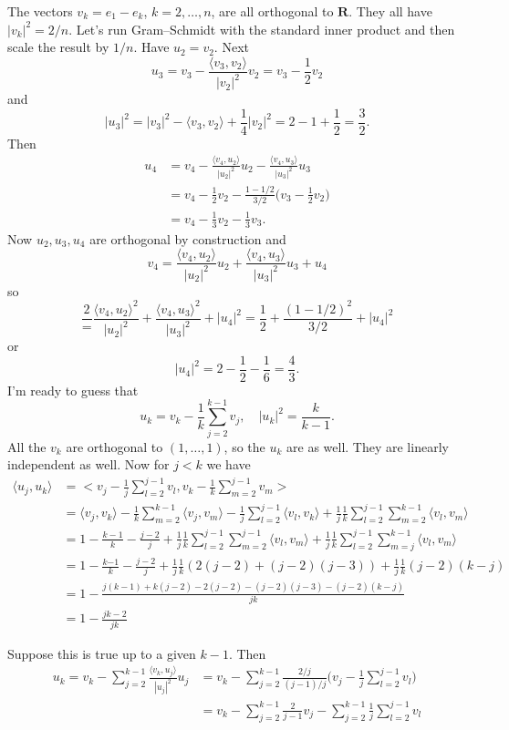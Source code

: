 \documentclass[11pt]{amsart}
\theoremstyle{definition}
\def\RR{\mathbf{R}}
\def\<{\langle}
\def\>{\rangle}
\begin{document}
The vectors $v_k = e_1 - e_k$, $k = 2, \ldots, n$, are all orthogonal to $\RR$.
They all have $|v_k|^2 = 2 / n$.
Let's run Gram--Schmidt with the standard inner product and then scale the result by $1/n$.
Have $u_2 = v_2$.
Next 
\[
u_3 
= v_3
- \frac{\<v_3, v_2\>}{|v_2|^2} v_2
= v_3
- \frac{1}{2} v_2
\]
and
\[
|u_3|^2
= |v_3|^2 - \< v_3, v_2 \> + \frac14 |v_2|^2
= 2 - 1 + \frac12
= \frac 32.
\]
Then
\begin{align*}
u_4
&= v_4
- \frac{\<v_4, u_2\>}{|u_2|^2} u_2
- \frac{\<v_4, u_3\>}{|u_3|^2} u_3
\\
&= v_4
- \frac{1}{2} v_2
- \frac{1 - 1/2}{3/2} \bigl(v_3 - \tfrac12 v_2\bigr)
\\
&= v_4
- \frac{1}{3} v_2
- \frac{1}{3} v_3.
\end{align*}
Now $u_2,u_3,u_4$ are orthogonal by construction and
\[
v_4
= 
\frac{\<v_4, u_2\>}{|u_2|^2} u_2
+ \frac{\<v_4, u_3\>}{|u_3|^2} u_3
+ u_4
\]
so
\[
\frac 2
= \frac{\<v_4, u_2\>^2}{|u_2|^2}
+ \frac{\<v_4, u_3\>^2}{|u_3|^2}
+ |u_4|^2
= \frac{1}{2}
+ \frac{(1 - 1/2)^2}{3/2}
+ |u_4|^2
\]
or
\[
|u_4|^2
= 2
- \frac{1}{2}
- \frac{1}{6}
= \frac{4}{3}.
\]
I'm ready to guess that
\[
u_k = v_k - \frac{1}{k} \sum_{j=2}^{k-1} v_j,
\quad
|u_k|^2 = \frac{k}{k-1}.
\]
All the $v_k$ are orthogonal to $(1,\ldots,1)$, so the $u_k$ are as well.
They are linearly independent as well.
Now for $j < k$ we have
\begin{align*}
\< u_j, u_k \>
&= \biggl<
v_j - \frac1j \sum_{l=2}^{j-1} v_l,
v_k - \frac1k \sum_{m=2}^{j-1} v_m
\biggr>
\\
&= 
\< v_j, v_k \>
- \frac1k \sum_{m=2}^{k-1} \< v_j, v_m \>
- \frac1j \sum_{l=2}^{j-1} \< v_l, v_k \>
+ \frac1j \frac1k 
\sum_{l=2}^{j-1} \sum_{m=2}^{k-1} \<v_l, v_m\>
\\
&= 
1
- \frac{k-1}{k} 
- \frac{j-2}{j}
+ \frac1j \frac1k \sum_{l=2}^{j-1} \sum_{m=2}^{j-1} \<v_l, v_m\>
+ \frac1j \frac1k \sum_{l=2}^{j-1} \sum_{m=j}^{k-1} \<v_l, v_m\>
\\
&= 
1
- \frac{k{-1}}{k} 
- \frac{j{-}2}{j}
+ \frac1j \frac1k ( 2(j{-}2) + (j{-}2)(j{-}3) )
+ \frac1j \frac1k (j{-}2)(k{-}j) 
\\
&= 
1
- \frac{j(k{-}1) + k(j{-}2) {-} 2(j{-}2) {-} (j{-}2)(j{-}3) {-} (j{-}2)(k{-}j)}{jk} 
\\
&= 
1
- \frac{jk - 2}{jk} 
\end{align*}

Suppose this is true up to a given $k-1$.
Then
\begin{align*}
u_k 
= v_k - \sum_{j=2}^{k-1} \frac{\<v_k, u_j\>}{|u_j|^2} u_j
&= v_k - \sum_{j=2}^{k-1} \frac{2/j}{(j-1)/j}
\biggl( v_j - \frac{1}{j} \sum_{l=2}^{j-1} v_l \biggr)
\\
&= v_k 
- \sum_{j=2}^{k-1} \frac{2}{j-1} v_j
- \sum_{j=2}^{k-1} \frac{1}{j} \sum_{l=2}^{j-1} v_l
\end{align*}
\end{document}
